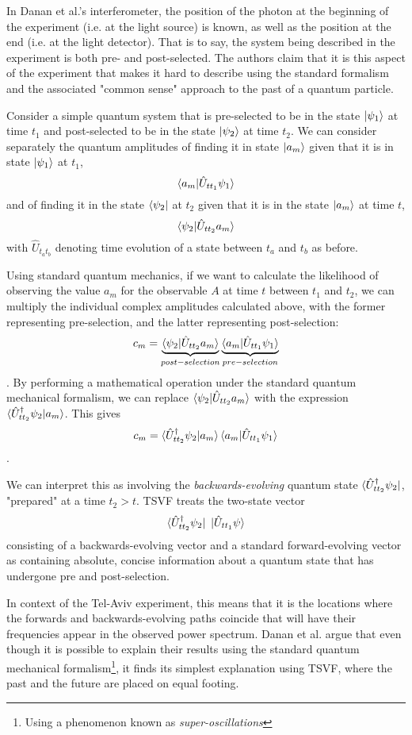 \documentclass{article}
\begin{document}
In Danan et al.'s interferometer, the position of the photon at the beginning 
of the experiment (i.e. at the light source) is known, as well as the position 
at the end (i.e.  at the light detector). That is to say, the system being 
described in the experiment is both pre- and post-selected. The authors claim 
that it is this aspect of the experiment that makes it hard to describe using 
the standard formalism and the associated "common sense" approach to the past 
of a quantum particle.

Consider a simple quantum system that is pre-selected to be in the state
$\ket{\psi_1}$ at time $t_1$ and post-selected to be in the state 
$\ket{\psi_2}$ at time $t_2$. We can consider separately the quantum amplitudes 
of finding it in state $\ket{a_m}$ given that it is in state $\ket{\psi_1}$ at 
$t_1$, $$\braket{a_m|\hat U_{t t_1} \psi_1}$$ and of finding it in the state 
$\bra{\psi_2}$ at $t_2$ given that it is in the state $\ket{a_m}$ at time $t$, 
$$\braket{\psi_2|\hat U_{t t_2} a_m}$$ with $\hat U_{t_a t_b}$ denoting time 
evolution of a state between $t_a$ and $t_b$ as before.

Using standard quantum mechanics, if we want to calculate the likelihood of 
observing the value $a_m$ for the observable $A$ at time $t$ between $t_1$ and 
$t_2$, we can multiply the individual complex amplitudes calculated above, with 
the former representing pre-selection, and the latter representing 
post-selection: $$c_m = \underbrace{\braket{\psi_2|\hat U_{t t_2} 
a_m}}_{post-selection} \underbrace{\braket{a_m|\hat U_{t t_1} 
\psi_1}}_{pre-selection}$$. By performing a mathematical operation under the 
standard quantum mechanical formalism, we can replace $\braket{\psi_2|\hat U_{t 
t_2} a_m}$ with the expression $\braket{\hat U_{t t_2}^{\dagger}\psi_2|a_m}$.  
This gives $$c_m = \braket{\hat U_{t t_2}^\dagger\psi_2| a_m} \braket{a_m|\hat 
U_{t t_1} \psi_1}$$. 

We can interpret this as involving the \textit{backwards-evolving} quantum 
state $\bra{\hat U_{t t_2}^{\dagger}\psi_2}$, "prepared" at a time $t_2 > t$.  
TSVF treats the two-state vector $$\bra{\hat U_{t t_2}^{\dagger}\psi_2} 
~\ket{\hat U_{t t_1}\psi}$$ consisting of a backwards-evolving vector and a 
standard forward-evolving vector as containing absolute, concise information 
about a quantum state that has undergone pre and post-selection.

In context of the Tel-Aviv experiment, this means that it is the locations 
where the forwards and backwards-evolving paths coincide that will have their 
frequencies appear in the observed power spectrum. Danan et al. argue that even 
though it is possible to explain their results using the standard quantum 
mechanical formalism\footnote{Using a phenomenon known as 
\textit{super-oscillations}}, it finds its simplest explanation using TSVF, 
where the past and the future are placed on equal footing.  
\end{document}
